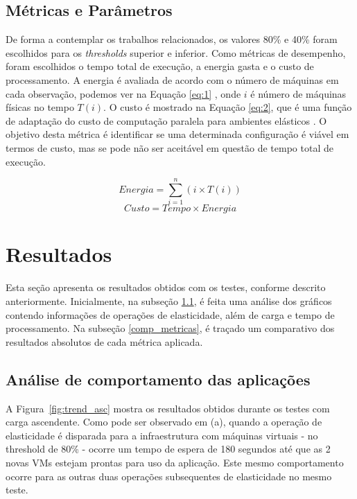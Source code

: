 \documentclass[twoside,english,brazilian]{UNISINOSartigo}
\begin{document}
\subsection{Métricas e Parâmetros}

De forma a contemplar os trabalhos relacionados, os valores 80\% e 40\% foram escolhidos para os \textit{thresholds} superior e inferior. Como métricas de desempenho, foram escolhidos o tempo total de execução, a energia gasta e o custo de processamento. A energia é avaliada de acordo com o número de máquinas em cada observação, podemos ver na Equação \ref{eq:1} , onde \(i\) é número de máquinas físicas no tempo \(T(i)\).  O custo é mostrado na Equação \ref{eq:2}, que é uma função de adaptação do custo de computação paralela para ambientes elásticos \cite{Barry2004}. O objetivo desta métrica é identificar se uma determinada configuração é viável em termos de custo, mas se pode não ser aceitável em questão de tempo total de execução. 

\begin{equation}
\label{eq:1}
Energia = \sum_{i=1}^{n}{(i \times T(i))}
\end{equation}
\begin{equation}
\label{eq:2}
Custo = Tempo \times Energia
\end{equation}

\section{Resultados}
\label{avaliacao}

Esta seção apresenta os resultados obtidos com os testes, conforme descrito anteriormente. Inicialmente, na subseção \ref{analise_comp}, é feita uma análise dos gráficos contendo informações de operações de elasticidade, além de carga e tempo de processamento. Na subseção \ref{comp_metricas}, é traçado um comparativo dos resultados absolutos de cada métrica aplicada. 

\subsection{Análise de comportamento das aplicações}
\label{analise_comp}
A Figura~\ref{fig:trend_asc} mostra os resultados obtidos durante os testes com carga ascendente. Como pode ser observado em (a), quando a operação de elasticidade é disparada para a infraestrutura com máquinas virtuais - no threshold de 80\% - ocorre um tempo de espera de 180 segundos até que as 2 novas VMs estejam prontas para uso da aplicação. Este mesmo comportamento ocorre para as outras duas operações subsequentes de elasticidade no mesmo teste.
\end{document}
